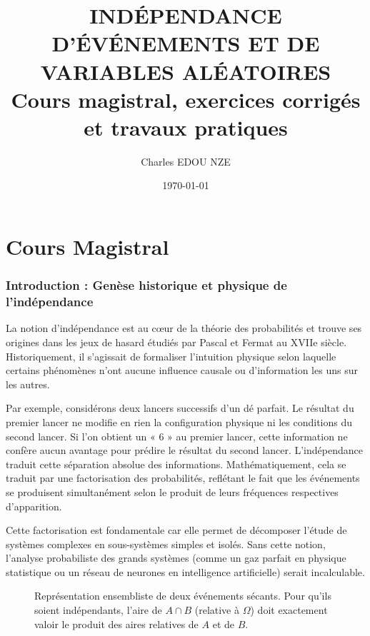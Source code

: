 \documentclass[11pt,a4paper]{article}
\title{\Huge INDÉPENDANCE D'ÉVÉNEMENTS ET DE VARIABLES ALÉATOIRES \\ \large Cours magistral, exercices corrigés et travaux pratiques}
\author{\Large Charles EDOU NZE}
\date{\today}
\begin{document}
\maketitle
\tableofcontents
\newpage

\part{Cours Magistral}

\section{Introduction : Genèse historique et physique de l'indépendance}

La notion d'indépendance est au cœur de la théorie des probabilités et trouve ses origines dans les jeux de hasard étudiés par Pascal et Fermat au XVIIe siècle. Historiquement, il s'agissait de formaliser l'intuition physique selon laquelle certains phénomènes n'ont aucune influence causale ou d'information les uns sur les autres.

Par exemple, considérons deux lancers successifs d'un dé parfait. Le résultat du premier lancer ne modifie en rien la configuration physique ni les conditions du second lancer. Si l'on obtient un « 6 » au premier lancer, cette information ne confère aucun avantage pour prédire le résultat du second lancer. L'indépendance traduit cette séparation absolue des informations. Mathématiquement, cela se traduit par une factorisation des probabilités, reflétant le fait que les événements se produisent simultanément selon le produit de leurs fréquences respectives d'apparition.

Cette factorisation est fondamentale car elle permet de décomposer l'étude de systèmes complexes en sous-systèmes simples et isolés. Sans cette notion, l'analyse probabiliste des grands systèmes (comme un gaz parfait en physique statistique ou un réseau de neurones en intelligence artificielle) serait incalculable.


\begin{figure}[h!]
\centering
{}
\caption{Représentation ensembliste de deux événements sécants. Pour qu'ils soient indépendants, l'aire de $A \cap B$ (relative à $\Omega$) doit exactement valoir le produit des aires relatives de $A$ et de $B$.}
\end{figure}
\end{document}
